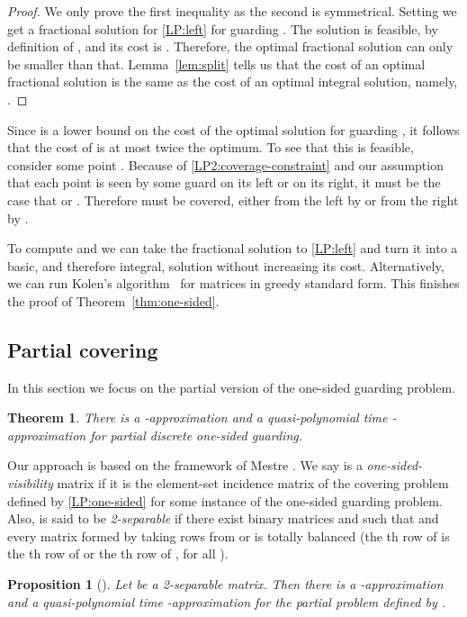 \documentclass[11pt]{article}
\newcommand{\qed}{\hfill\bigskip}
\newtheorem{theorem}{Theorem}
\newtheorem{proposition}{Proposition}
\begin{document}
\begin{proof}
  We only prove the first inequality as the second is symmetrical.
  Setting  we get a fractional solution for \eqref{LP:left}
  for guarding . The solution  is feasible, by definition of ,
  and its cost is . Therefore, the optimal
  fractional solution can only be smaller than that. Lemma~\ref{lem:split} tells
  us that the cost of an optimal fractional solution is the same as the cost
  of an optimal integral solution, namely, . \qed
\end{proof}

Since 
is a lower bound on the cost of the optimal solution for guarding , it follows that
the cost of  is at most twice the optimum. To see that this
is feasible, consider some point . Because of
\eqref{LP2:coverage-constraint} and our assumption that each point is seen by
some guard on its left or on its right, it must be the case that 
or . Therefore  must be covered, either from the left by 
or from the right by .

To compute  and  we can take the fractional solution to
\eqref{LP:left} and turn it into a basic, and therefore integral, solution
without increasing its cost. Alternatively, we can run Kolen's
algorithm~\cite{thesis/Kolen82} for matrices in greedy standard form. This
finishes the proof of Theorem~\ref{thm:one-sided}.

\subsection{Partial covering}

In this section we focus on the partial version of the one-sided guarding problem.

\begin{theorem} \label{thm:partial}
  There is a -approximation and a quasi-polynomial time
  -approximation for partial discrete one-sided guarding.
\end{theorem}

Our approach is based on the framework of Mestre
\cite{conf/stacs/Mestre08}. We say  is a \emph{one-sided-visibility} matrix
if it is the element-set incidence matrix of the covering problem defined by
\eqref{LP:one-sided} for some instance of the one-sided guarding problem.
Also,  is said to be \emph{2-separable} if there exist binary matrices 
and  such that  and every matrix  formed by taking rows
from  or  is totally balanced (the th row of  is the th row
of  or the th row of , for all ).

\begin{proposition}[\cite{conf/stacs/Mestre08}] \label{prop:partial}
  Let  be a 2-separable matrix. Then there is a -approximation
  and a quasi-polynomial time -approximation for the partial
  problem defined by .
\end{proposition}
\end{document}
